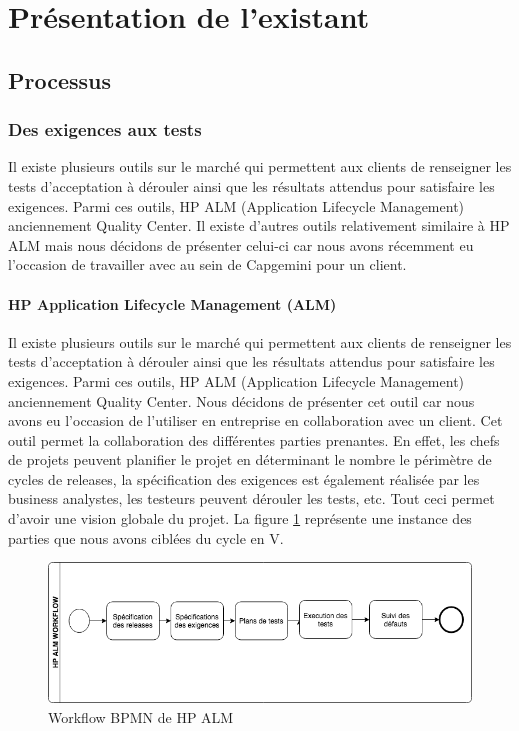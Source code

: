 \section{Présentation de l'existant}

    \subsection{Processus}
        \subsubsection{Des exigences aux tests}
        Il existe plusieurs outils sur le marché qui permettent aux clients de renseigner les tests d’acceptation à dérouler ainsi que les résultats attendus pour satisfaire les exigences. Parmi ces outils, HP ALM (Application Lifecycle Management) anciennement Quality Center. Il existe d’autres outils relativement similaire à HP ALM mais nous décidons de présenter celui-ci car nous avons récemment eu l’occasion de travailler avec au sein de Capgemini pour un client.
        
        \paragraph{HP Application Lifecycle Management (ALM)}
        Il existe plusieurs outils sur le marché qui permettent aux clients de renseigner les tests d’acceptation à dérouler ainsi que les résultats attendus pour satisfaire les exigences. Parmi ces outils, HP ALM (Application Lifecycle Management) anciennement Quality Center. Nous décidons de présenter cet outil car nous avons eu l'occasion de l'utiliser en entreprise en collaboration avec un client. 
        Cet outil permet la collaboration des différentes parties prenantes. En effet, les chefs de projets peuvent planifier le projet en déterminant le nombre le périmètre de cycles de releases, la spécification des exigences est également réalisée par les business analystes, les testeurs peuvent dérouler les tests, etc. Tout ceci permet d'avoir une vision globale du projet. La figure \ref{fig:hp} représente une instance des parties que nous avons ciblées du cycle en V. 
        
         \begin{figure}[H]
                \centering
                \includegraphics[width=\textwidth]{images/hpworkflowbpmn.png}
                \caption{Workflow BPMN de HP ALM}
                \label{fig:hp}
            \end{figure}
        
